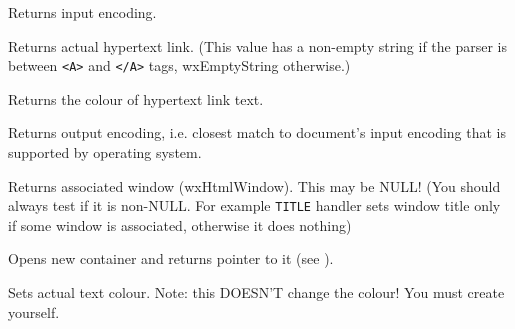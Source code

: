 
Returns input encoding.

\label{wxhtmlwinparsergetlink}


Returns actual hypertext link. (This value has a non-empty 
 string
if the parser is between {\tt <A>} and {\tt </A>} tags,
wxEmptyString otherwise.)

\label{wxhtmlwinparsergetlinkcolor}


Returns the colour of hypertext link text.

\label{wxhtmlwinparsergetoutputencoding}


Returns output encoding, i.e. closest match to document's input encoding
that is supported by operating system.

\label{wxhtmlwinparsergetwindow}


Returns associated window (wxHtmlWindow). This may be NULL! (You should always
test if it is non-NULL. For example {\tt TITLE} handler sets window
title only if some window is associated, otherwise it does nothing)

\label{wxhtmlwinparseropencontainer}


Opens new container and returns pointer to it (see ).

\label{wxhtmlwinparsersetactualcolor}


Sets actual text colour. Note: this DOESN'T change the colour!
You must create  yourself.

\label{wxhtmlwinparsersetalign}


